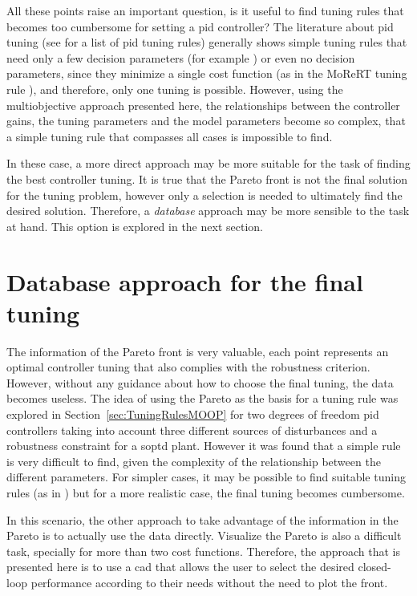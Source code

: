 All these points raise an important question, is it useful to find tuning rules that becomes too cumbersome for setting a \gls{pid} controller? The literature about \gls{pid} tuning (see \citet{ODwyer2000} for a list of \gls{pid} tuning rules) generally shows simple tuning rules that need only a few decision parameters (for example \citet{Skogestad2003}) or even no decision parameters, since they minimize a single cost function (as in the MoReRT tuning rule \citep{Alfaro2016}), and therefore, only one tuning is possible. However, using the multiobjective approach presented here, the relationships between the controller gains, the tuning parameters and the model parameters become so complex, that a simple tuning rule that compasses all cases is impossible to find.

In these case, a more direct approach may be more suitable for the task of finding the best controller tuning. It is true that the Pareto front is not the final solution for the tuning problem, however only a selection is needed to ultimately find the desired solution. Therefore, a \textit{database} approach may be more sensible to the task at hand. This option is explored in the next section.
%
\section{Database approach for the final tuning}
\label{sec:DatabaseMOOP}
%
The information of the Pareto front is very valuable, each point represents an optimal controller tuning that also complies with the robustness criterion. However, without any guidance about how to choose the final tuning, the data becomes useless. The idea of using the Pareto as the basis for a tuning rule was explored in Section~\ref{sec:TuningRulesMOOP} for two degrees of freedom \gls{pid} controllers taking into account three different sources of disturbances and a robustness constraint for a \gls{soptd} plant. However it was found that a simple rule is very difficult to find, given the complexity of the relationship between the different parameters. For simpler cases, it may be possible to find suitable tuning rules (as in \citet{ContrerasLeiva2015a}) but for a more realistic case, the final tuning becomes cumbersome.

In this scenario, the other approach to take advantage of the information in the Pareto is to actually use the data directly. Visualize the Pareto is also a difficult task, specially for more than two cost functions. Therefore, the approach that is presented here is to use a \gls{cad} that allows the user to select the desired closed-loop performance according to their needs without the need to plot the front.

